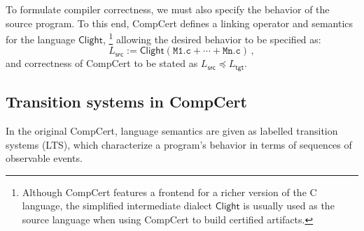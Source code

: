 \documentclass[acmsmall,authordraft]{acmart}
\newcommand{\kw}[1]{\ensuremath{ \mathsf{#1} }}
\newcommand{\refby}{\preceq}
\begin{document}
To formulate compiler correctness,
we must also specify the behavior of the source program.
To this end,
CompCert defines a linking operator
and semantics
for the language $\kw{Clight}$,%
\footnote{
  Although CompCert features a frontend for a richer version
  of the C language,
  the simplified intermediate dialect \kw{Clight}
  is usually used as the source language
  when using CompCert to build certified artifacts.
}
allowing the desired behavior to be specified as:
\[
    L_\kw{src} :=
    \kw{Clight}(\texttt{M1.c} + \cdots + \texttt{Mn.c}) \,,
\]
and correctness of CompCert
to be stated as $L_\kw{src} \refby L_\kw{tgt}$.


\subsection{Transition systems in CompCert} \label{sec:sem:closed} %

In the original CompCert, language semantics are
given as labelled transition systems (LTS),
which characterize a program's behavior in terms of
sequences of observable events.
\end{document}
